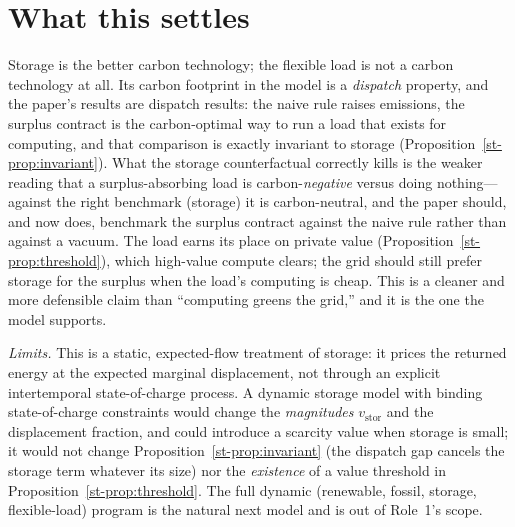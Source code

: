 \section{What this settles}
\begin{remark}
Storage is the better carbon technology; the flexible load is not a carbon technology at all.
Its carbon footprint in the model is a \emph{dispatch} property, and the paper's results are
dispatch results: the naive rule raises emissions, the surplus contract is the carbon-optimal
way to run a load that exists for computing, and that comparison is exactly invariant to
storage (Proposition~\ref{st-prop:invariant}). What the storage counterfactual correctly kills is
the weaker reading that a surplus-absorbing load is carbon-\emph{negative} versus doing
nothing---against the right benchmark (storage) it is carbon-neutral, and the paper should, and
now does, benchmark the surplus contract against the naive rule rather than against a vacuum.
The load earns its place on private value (Proposition~\ref{st-prop:threshold}), which high-value
compute clears; the grid should still prefer storage for the surplus when the load's computing
is cheap. This is a cleaner and more defensible claim than ``computing greens the grid,'' and
it is the one the model supports.
\end{remark}
\emph{Limits.} This is a static, expected-flow treatment of storage: it prices the returned
energy at the expected marginal displacement, not through an explicit intertemporal
state-of-charge process. A dynamic storage model with binding state-of-charge constraints
would change the \emph{magnitudes} $v_{\mathrm{stor}}$ and the displacement fraction, and could
introduce a scarcity value when storage is small; it would not change
Proposition~\ref{st-prop:invariant} (the dispatch gap cancels the storage term whatever its size)
nor the \emph{existence} of a value threshold in Proposition~\ref{st-prop:threshold}. The full
dynamic (renewable, fossil, storage, flexible-load) program is the natural next model and is
out of Role~1's scope.
